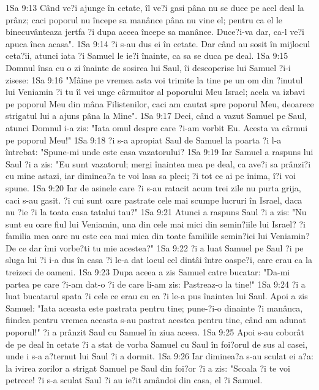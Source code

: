 1Sa 9:13  Când ve?i ajunge în cetate, îl ve?i gasi pâna nu se duce pe acel deal la prânz; caci poporul nu începe sa manânce pâna nu vine el; pentru ca el le binecuvânteaza jertfa ?i dupa aceea începe sa manânce. Duce?i-va dar, ca-l ve?i apuca înca acasa".
1Sa 9:14  ?i s-au dus ei în cetate. Dar când au sosit în mijlocul ceta?ii, atunci iata ?i Samuel le ie?i înainte, ca sa se duca pe deal.
1Sa 9:15  Domnul însa cu o zi înainte de sosirea lui Saul, îi descoperise lui Samuel ?i-i zisese:
1Sa 9:16  "Mâine pe vremea asta voi trimite la tine pe un om din ?inutul lui Veniamin ?i tu îl vei unge cârmuitor al poporului Meu Israel; acela va izbavi pe poporul Meu din mâna Filistenilor, caci am cautat spre poporul Meu, deoarece strigatul lui a ajuns pâna la Mine".
1Sa 9:17  Deci, când a vazut Samuel pe Saul, atunci Domnul i-a zis: "Iata omul despre care ?i-am vorbit Eu. Acesta va cârmui pe poporul Meu!"
1Sa 9:18  ?i s-a apropiat Saul de Samuel la poarta ?i l-a întrebat: "Spune-mi unde este casa vazatorului?
1Sa 9:19  Iar Samuel a raspuns lui Saul ?i a zis: "Eu sunt vazatorul; mergi înaintea mea pe deal, ca ave?i sa prânzi?i cu mine astazi, iar diminea?a te voi lasa sa pleci; ?i tot ce ai pe inima, î?i voi spune.
1Sa 9:20  Iar de asinele care ?i s-au ratacit acum trei zile nu purta grija, caci s-au gasit. ?i cui sunt oare pastrate cele mai scumpe lucruri în Israel, daca nu ?ie ?i la toata casa tatalui tau?"
1Sa 9:21  Atunci a raspuns Saul ?i a zis: "Nu sunt eu oare fiul lui Veniamin, una din cele mai mici din semin?iile lui Israel? ?i familia mea oare nu este cea mai mica din toate familiile semin?iei lui Veniamin? De ce dar îmi vorbe?ti tu mie acestea?"
1Sa 9:22  ?i a luat Samuel pe Saul ?i pe sluga lui ?i i-a dus în casa ?i le-a dat locul cel dintâi între oaspe?i, care erau ca la treizeci de oameni.
1Sa 9:23  Dupa aceea a zis Samuel catre bucatar: "Da-mi partea pe care ?i-am dat-o ?i de care li-am zis: Pastreaz-o la tine!"
1Sa 9:24  ?i a luat bucatarul spata ?i cele ce erau cu ea ?i le-a pus înaintea lui Saul. Apoi a zis Samuel: "Iata aceasta este pastrata pentru tine; pune-?i-o dinainte ?i manânca, fiindca pentru vremea aceasta s-au pastrat acestea pentru tine, când am adunat poporul!" ?i a prânzit Saul cu Samuel în ziua aceea.
1Sa 9:25  Apoi s-au coborât de pe deal în cetate ?i a stat de vorba Samuel cu Saul în foi?orul de sus al casei, unde i s-a a?ternut lui Saul ?i a dormit.
1Sa 9:26  Iar diminea?a s-au sculat ei a?a: la ivirea zorilor a strigat Samuel pe Saul din foi?or ?i a zis: "Scoala ?i te voi petrece! ?i s-a sculat Saul ?i au ie?it amândoi din casa, el ?i Samuel.
